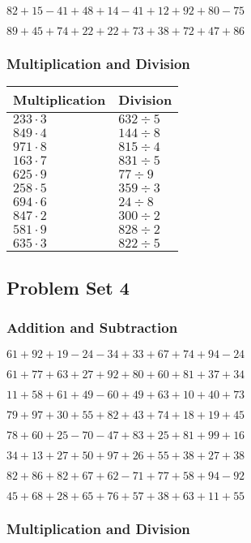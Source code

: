 \(82+15-41+48+14-41+12+92+80-75\)

\(89+45+74+22+22+73+38+72+47+86\)

\hypertarget{multiplication-and-division-2}{%
\subsubsection{Multiplication and
Division}\label{multiplication-and-division-2}}

\begin{longtable}[]{@{}ll@{}}
\toprule
Multiplication & Division\tabularnewline
\midrule
\endhead
\(233\cdot3\) & \(632÷5\)\tabularnewline
\(849\cdot4\) & \(144÷8\)\tabularnewline
\(971\cdot8\) & \(815÷4\)\tabularnewline
\(163\cdot7\) & \(831÷5\)\tabularnewline
\(625\cdot9\) & \(77÷9\)\tabularnewline
\(258\cdot5\) & \(359÷3\)\tabularnewline
\(694\cdot6\) & \(24÷8\)\tabularnewline
\(847\cdot2\) & \(300÷2\)\tabularnewline
\(581\cdot9\) & \(828÷2\)\tabularnewline
\(635\cdot3\) & \(822÷5\)\tabularnewline
\bottomrule
\end{longtable}

\hypertarget{problem-set-4}{%
\subsection{Problem Set 4}\label{problem-set-4}}

\hypertarget{addition-and-subtraction-3}{%
\subsubsection{Addition and
Subtraction}\label{addition-and-subtraction-3}}

\(61+92+19-24-34+33+67+74+94-24\)

\(61+77+63+27+92+80+60+81+37+34\)

\(11+58+61+49-60+49+63+10+40+73\)

\(79+97+30+55+82+43+74+18+19+45\)

\(78+60+25-70-47+83+25+81+99+16\)

\(34+13+27+50+97+26+55+38+27+38\)

\(82+86+82+67+62-71+77+58+94-92\)

\(45+68+28+65+76+57+38+63+11+55\)

\hypertarget{multiplication-and-division-3}{%
\subsubsection{Multiplication and
Division}\label{multiplication-and-division-3}}


